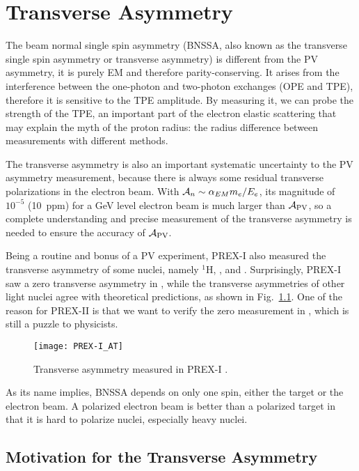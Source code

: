 \chapter{Transverse Asymmetry}
The beam normal single spin asymmetry (BNSSA, also known as the transverse single spin asymmetry
or transverse asymmetry) is different from the PV asymmetry, it is purely 
EM and therefore parity-conserving. It arises from the interference
between the one-photon and two-photon exchanges (OPE and TPE), therefore it is sensitive 
to the TPE amplitude. By measuring it, we can probe the strength of the TPE, an 
important part of the electron elastic scattering that may explain the myth
of the proton radius: the radius difference between measurements with different methods.

The transverse asymmetry is also an important systematic uncertainty to the PV 
asymmetry measurement, because there is always some residual transverse polarizations
in the electron beam. With $\mathcal{A}_n \sim \alpha_{EM}m_e/E_e$, its magnitude of $10^{-5}$ (10~ppm)
for a GeV level electron beam is much larger than $\mathcal{A}_{\text{PV}}$, so a complete 
understanding and precise measurement of the transverse asymmetry is needed
to ensure the accuracy of $\mathcal{A}_{\text{PV}}$.

Being a routine and bonus of a PV experiment, PREX-I also measured the transverse
asymmetry of some nuclei, namely ${}^{1}$H, \He, \C and \Pb. Surprisingly, PREX-I
saw a zero transverse asymmetry in \Pb, while the transverse asymmetries of other 
light nuclei agree with theoretical predictions, as shown in 
Fig.~\ref{fig:PREX-I_AT}. One of the reason for PREX-II is that we want to
verify the zero measurement in \Pb, which is still a puzzle to physicists.
\begin{figure}[!h]
    \centering
    \texttt{[image: PREX-I\_AT]}
    \caption{Transverse asymmetry measured in PREX-I \cite{PhysRevLett.109.192501}.}
    \label{fig:PREX-I_AT}
\end{figure}

As its name implies, BNSSA depends on only one spin, either the target or the
electron beam. A polarized electron beam is better than a polarized target in that 
it is hard to polarize nuclei, especially heavy nuclei.

\section{Motivation for the Transverse Asymmetry}


